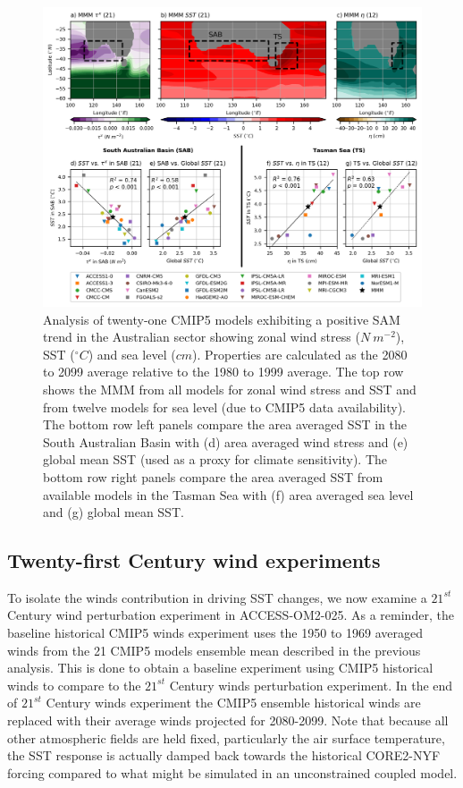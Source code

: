 \documentclass[draft,linenumbers]{agujournal2018}
\begin{document}
\begin{figure}[h]
\centering
\includegraphics[trim={0 0 0 0},clip, width=1\textwidth]{p26_fig2_.png}
\caption{Analysis of twenty-one CMIP5 models exhibiting a positive SAM trend in the Australian sector showing zonal wind stress ($N\ m^{-2}$), SST ($^{\circ}C$) and sea level ($cm$). Properties are calculated as the 2080 to 2099 average relative to the 1980 to 1999 average. The top row shows the MMM from all models for zonal wind stress and SST and from twelve models for sea level (due to CMIP5 data availability). The bottom row left panels compare the area averaged SST in the South Australian Basin with (d) area averaged wind stress and (e) global mean SST (used as a proxy for climate sensitivity). The bottom row right panels compare the area averaged SST from available models in the Tasman Sea with (f) area averaged sea level and (g) global mean SST.}\label{p26_fig1_}
\end{figure}


\subsection{Twenty-first Century wind experiments} \label{Twenty-first Century winds experiment}
To isolate the winds contribution in driving SST changes, we now examine a $21^{st}$ Century wind perturbation experiment in ACCESS-OM2-025. As a reminder, the baseline historical CMIP5 winds experiment uses the 1950 to 1969 averaged winds from the 21 CMIP5 models ensemble mean described in the previous analysis. This is done to obtain a baseline experiment using CMIP5 historical winds to compare to the $21^{st}$ Century winds perturbation experiment. In the end of $21^{st}$ Century winds experiment the CMIP5 ensemble historical winds are replaced with their average winds projected for 2080-2099. Note that because all other atmospheric fields are held fixed, particularly the air surface temperature, the SST response is actually damped back towards the historical CORE2-NYF forcing compared to what might be simulated in an unconstrained coupled model.
\end{document}
